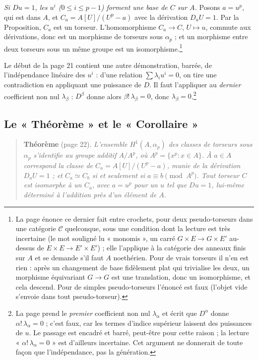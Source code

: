 \documentclass[11pt,a4paper]{article}
\begin{document}
\emph{Si $Du = 1$, les $u^i$ ($0 \le i \le p-1$) forment une base de $C$ sur
$A$.} Posons $a = u^p$, qui est dans $A$, et $C_a = A[U]/(U^p - a)$ avec la
dérivation $D_a U = 1$. Par la Proposition, $C_a$ est un torseur. L'homomorphisme
$C_a \to C$, $U \mapsto u$, commute aux dérivations, donc est un morphisme de
torseurs sous $\alpha_p$ ; et un morphisme entre deux torseurs sous un même
groupe est un isomorphisme.\footnote{La page énonce ce dernier fait entre
crochets, pour deux pseudo-torseurs dans une catégorie $\mathcal{C}$
quelconque, sous une condition dont la lecture est très incertaine (le mot
souligné lu « monomis », un carré $G \times E \to G \times E'$ au-dessus de
$E \times E \to E' \times E'$) ; elle l'applique à la catégorie des anneaux
finis sur $A$ et se demande s'il faut $A$ noethérien. Pour de vrais torseurs
il n'en est rien : après un changement de base fidèlement plat qui trivialise
les deux, un morphisme équivariant $G \to G$ est une translation, donc un
isomorphisme, et cela descend. Pour de simples pseudo-torseurs l'énoncé est
faux (l'objet vide s'envoie dans tout pseudo-torseur).}

Le début de la page 21 contient une autre démonstration, barrée, de
l'indépendance linéaire des $u^i$ : d'une relation $\sum \lambda_i u^i = 0$,
on tire une contradiction en appliquant une puissance de $D$. Il faut
l'appliquer au \emph{dernier} coefficient non nul $\lambda_\beta$ : $D^\beta$
donne alors $\beta!\,\lambda_\beta = 0$, donc $\lambda_\beta =
0$.\footnote{La page prend le \emph{premier} coefficient non nul
$\lambda_\alpha$ et écrit que $D^\alpha$ donne $\alpha!\,\lambda_\alpha = 0$ ;
c'est faux, car les termes d'indice supérieur laissent des puissances de $u$.
Le passage est encadré et barré, peut-être pour cette raison ; la lecture
« $\alpha!\,\lambda_\alpha = 0$ » est d'ailleurs incertaine. Cet argument ne
donnerait de toute façon que l'indépendance, pas la génération.}

\subsection*{Le « Théorème » et le « Corollaire »}

\begin{quote}
\textbf{Théorème} (page 22). \emph{L'ensemble $H^1(A, \alpha_p)$ des classes
de torseurs sous $\alpha_p$ s'identifie au groupe additif $A/A^p$, où
$A^p = \{x^p : x \in A\}$. À $a \in A$ correspond la classe de
$C_a = A[U]/(U^p - a)$, munie de la dérivation $D_a U = 1$ ; et
$C_a \simeq C_b$ si et seulement si $a \equiv b \pmod{A^p}$. Tout torseur
$C$ est isomorphe à un $C_a$, avec $a = u^p$ pour un $u$ tel que $Du = 1$,
lui-même déterminé à l'addition près d'un élément de $A$.}
\end{quote}
\end{document}
